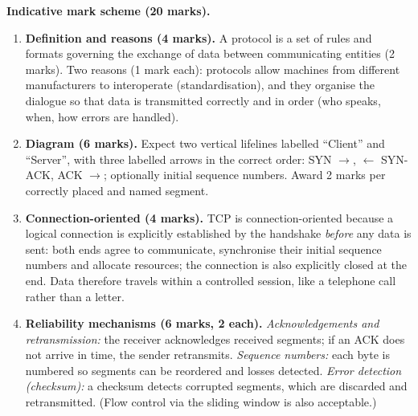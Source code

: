 \documentclass[11pt]{article}
\newcommand{\legende}[1]{\par\vspace{6pt}{\popsemi\fontsize{9}{11.5}\selectfont\color{popmuted}#1}}
\begin{document}
\begin{corrige}
\textbf{Indicative mark scheme (20 marks).}
\begin{enumerate}
\item \textbf{Definition and reasons (4 marks).} A protocol is a set of rules and formats governing the exchange of data between communicating entities (2 marks). Two reasons (1 mark each): protocols allow machines from different manufacturers to interoperate (standardisation), and they organise the dialogue so that data is transmitted correctly and in order (who speaks, when, how errors are handled).
\item \textbf{Diagram (6 marks).} Expect two vertical lifelines labelled ``Client'' and ``Server'', with three labelled arrows in the correct order: SYN $\rightarrow$, $\leftarrow$ SYN-ACK, ACK $\rightarrow$; optionally initial sequence numbers. Award 2 marks per correctly placed and named segment.
\begin{popfigure}
\legende{The TCP three-way handshake.}
\end{popfigure}
\item \textbf{Connection-oriented (4 marks).} TCP is connection-oriented because a logical connection is explicitly established by the handshake \emph{before} any data is sent: both ends agree to communicate, synchronise their initial sequence numbers and allocate resources; the connection is also explicitly closed at the end. Data therefore travels within a controlled session, like a telephone call rather than a letter.
\item \textbf{Reliability mechanisms (6 marks, 2 each).} \emph{Acknowledgements and retransmission:} the receiver acknowledges received segments; if an ACK does not arrive in time, the sender retransmits. \emph{Sequence numbers:} each byte is numbered so segments can be reordered and losses detected. \emph{Error detection (checksum):} a checksum detects corrupted segments, which are discarded and retransmitted. (Flow control via the sliding window is also acceptable.)
\end{enumerate}
\end{corrige}
\end{document}
